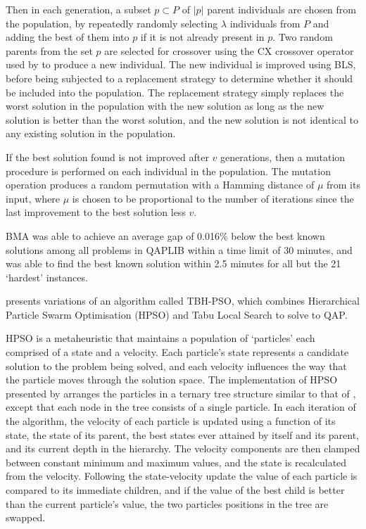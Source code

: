 {	Then in each generation, a subset \(p \subset P\) of \(|p|\) parent individuals are chosen from the population, by repeatedly randomly selecting \(\lambda\) individuals from \(P\) and adding the best of them into \(p\) if it is not already present in \(p\).
	Two random parents from the set \(p\) are selected for crossover using the CX crossover operator used by \citet{Merz:2000ek} to produce a new individual. %
	The new individual is improved using BLS, before being subjected to a replacement strategy to determine whether it should be included into the population. The replacement strategy simply replaces the worst solution in the population with the new solution as long as the new solution is better than the worst solution, and the new solution is not identical to any existing solution in the population.

	If the best solution found is not improved after \(v\) generations, then a mutation procedure is performed on each individual in the population. The mutation operation produces a random permutation with a Hamming distance of \(\mu\) from its input, where \(\mu\) is chosen to be proportional to the number of iterations since the last improvement to the best solution less \(v\).

	BMA was able to achieve an average gap of 0.016\% below the best known solutions among all problems in QAPLIB within a time limit of 30 minutes, and was able to find the best known solution within 2.5 minutes for all but the 21 `hardest' instances.



	\citet{Helal:2015de} presents variations of an algorithm called TBH-PSO, which combines Hierarchical Particle Swarm Optimisation (HPSO) and Tabu Local Search to solve to QAP.

	HPSO is a metaheuristic that maintains a population of `particles' each comprised of a state and a velocity. Each particle's state represents a candidate solution to the problem being solved, and each velocity influences the way that the particle moves through the solution space.
	The implementation of HPSO presented by \citeauthor{Helal:2015de} arranges the particles in a ternary tree structure similar to that of \citet{Harris:2015kw}, except that each node in the tree consists of a single particle.
	In each iteration of the algorithm, the velocity of each particle is updated using a function of its state, the state of its parent, the best states ever attained by itself and its parent, and its current depth in the hierarchy.
	The velocity components are then clamped between constant minimum and maximum values, and the state is recalculated from the velocity.
	Following the state-velocity update the value of each particle is compared to its immediate children, and if the value of the best child is better than the current particle's value, the two particles positions in the tree are swapped.

}
